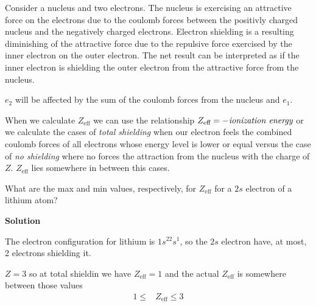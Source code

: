 \documentclass[../mit-general-chemistry.tex]{subfiles}
\begin{document}
\begin{hfigure}
  \begin{center}
  \end{center}
  \caption{
    Consider a nucleus and two electrons. The nucleus is exercising an
    attractive force on the electrons due to the coulomb forces
    between the positivly charged nucleus and the negatively charged
    electrons.
    Electron shielding is a resulting diminishing of the attractive
    force due to the repulsive force exercised by the inner electron
    on the outer electron. The net result can be interpreted as if the
    inner electron is shielding the outer electron from the attractive
    force from the nucleus.
  }
\end{hfigure}

$e_2$ will be affected by the sum of the coulomb forces from the
nucleus and $e_1$.

When we calculate $Z_{\text{eff}}$ we can use the relationship
$Z_{\text{eff}} = - \text{{\em ionization energy}}$ or we calculate
the cases of {\em total shielding} when our electron feels the
combined coulomb forces of all electrons whose energy level is lower
or equal versus the case of {\em no shielding} where no forces the
attraction from the nucleus with the charge of $Z$. $Z_{\text{eff}}$
lies somewhere in between this cases.



\begin{example}
  What are the max and min values, respectively, for $Z_{\text{eff}}$
  for a $2s$ electron of a lithium atom?

  \textbf{Solution}

  The electron configuration for lithium is $1s^22s^1$, so the $2s$
  electron have, at most, 2 electrons shielding it.

  $Z = 3$ so at total shieldin we have $Z_{\text{eff}} = 1$ and the
  actual $Z_{\text{eff}}$ is somewhere between those values
  \begin{align*}
    1 \leq &Z_{\text{eff}} \leq 3 \\
  \end{align*}
\end{example}
\end{document}
